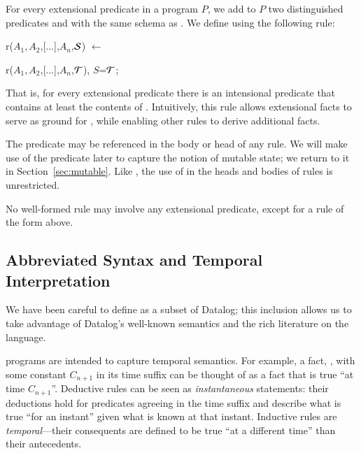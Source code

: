 For every extensional predicate  in a \slang program $P$, we add to
$P$ two distinguished predicates  and  with the same schema
as .  We define  using the following rule:

\begin{dedalus}
r\pos($A_1,A_2$,[...],$A_n$,\(\SDedalus\)) \(\leftarrow\)
\end{dedalus}

\hspace{5mm}
\begin{dedalus}
   r($A_1,A_2$,[...],$A_n$,\(\Tau\)), \(S\)=\(\Tau\);
\end{dedalus}

That is, for every extensional predicate  there is an intensional
predicate  that contains at least the contents of .
Intuitively, this rule allows extensional facts to serve as ground for
, while enabling other rules to derive additional  facts.

The predicate  may be referenced in the body or head of any \slang rule.  
We will make use of the predicate  later to capture the notion of mutable state; we return to it in Section~\ref{sec:mutable}. 
Like , the use of  in the heads and bodies of rules is unrestricted.

\vspace{1.2em}
No well-formed \slang rule may involve any extensional predicate, except for a rule of the form above.




\subsection{Abbreviated Syntax and Temporal Interpretation}

\label{sec:abbrvsyntax}

We have been careful to define \slang as a subset of Datalog; this inclusion allows us to take advantage of Datalog's
well-known semantics and the rich literature on the language.

\slang programs are intended to capture 
temporal semantics.  For example, a fact, , with some constant $C_{n+1}$ in its time
suffix can be thought of as a fact that is true ``at time $C_{n+1}$''.
Deductive rules can be seen as {\em instantaneous} statements: their deductions hold for 
predicates agreeing in the time suffix and describe what is true ``for an instant'' given 
what is known at that instant.
 Inductive %
 rules are {\em temporal}---their consequents are defined to
be true ``at a different time'' than their antecedents. 



